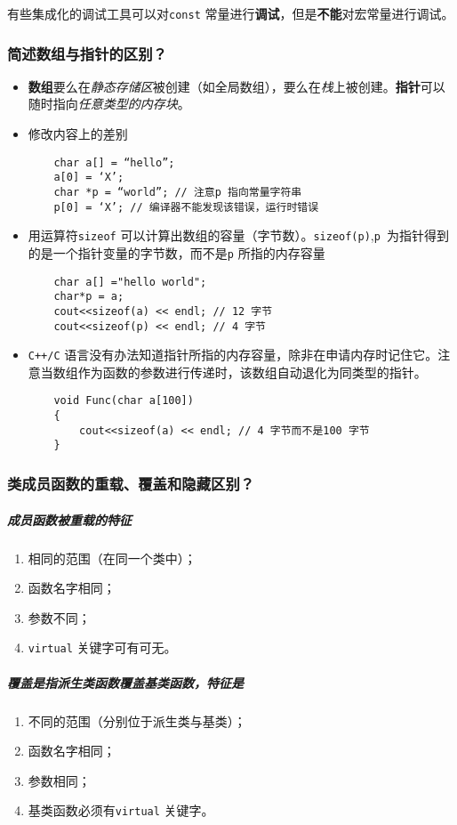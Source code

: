 \documentclass[UTF8,a4paper,8pt]{ctexart}
\begin{document}
			有些集成化的调试工具可以对\verb|const| 常量进行\textbf{调试}，但是\textbf{不能}对宏常量进行调试。
		\subsubsection{简述数组与指针的区别？}
			\begin{itemize}
				\item \textbf{数组}要么在\textit{静态存储区}被创建（如全局数组），要么在\textit{栈}上被创建。\textbf{指针}可以随时指向\textit{任意类型的内存块}。
				\item 修改内容上的差别
					\begin{lstlisting}
	char a[] = “hello”;
	a[0] = ‘X’;
	char *p = “world”; // 注意p 指向常量字符串
	p[0] = ‘X’; // 编译器不能发现该错误，运行时错误
					\end{lstlisting}
				\item 用运算符\verb|sizeof| 可以计算出数组的容量（字节数）。\verb|sizeof(p)|,\verb|p |为指针得到的是一个指针变量的字节数，而不是\verb|p| 所指的内存容量
				
					\begin{lstlisting}
	char a[] ="hello world";
	char*p = a;
	cout<<sizeof(a) << endl; // 12 字节
	cout<<sizeof(p) << endl; // 4 字节
					\end{lstlisting}
				
				\item \verb|C++/C| 语言没有办法知道指针所指的内存容量，除非在申请内存时记住它。注意当数组作为函数的参数进行传递时，该数组自动退化为同类型的指针。
					\begin{lstlisting}
	void Func(char a[100])
	{
		cout<<sizeof(a) << endl; // 4 字节而不是100 字节
	}
					\end{lstlisting}
			\end{itemize}
		\subsubsection{类成员函数的重载、覆盖和隐藏区别？}
			\subparagraph{成员函数被重载的特征}
				\begin{enumerate}
					\item 相同的范围（在同一个类中）；
					\item 函数名字相同；
					\item 参数不同；
					\item \verb|virtual| 关键字可有可无。
				\end{enumerate}
			\subparagraph{覆盖是指派生类函数覆盖基类函数，特征是}
				\begin{enumerate}
					\item 不同的范围（分别位于派生类与基类）；
					\item 函数名字相同；
					\item 参数相同；
					\item 基类函数必须有\verb|virtual| 关键字。
				\end{enumerate}
			
\end{document}
